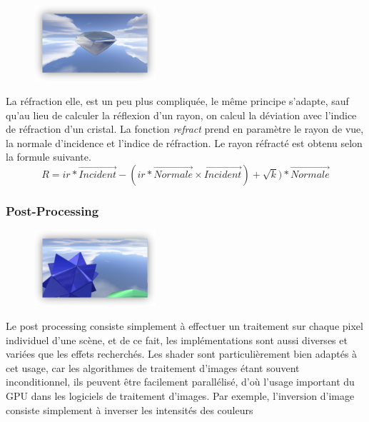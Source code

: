 \documentclass[pdftex, 11pt, a4paper, titlepage]{article}
\newcommand{\vect}[1]{\overrightarrow{#1}}
\begin{document}
\begin{figure}
\vspace{-35pt}
\begin{centering}
\includegraphics[width=0.4\textwidth]{ssRefract}
\end{centering}
\vspace{-35pt}
\end{figure}

La réfraction elle, est un peu plus compliquée, le même principe s'adapte, 
sauf qu'au lieu de calculer la réflexion d'un rayon, on calcul la 
déviation avec l'indice de réfraction d'un cristal. La fonction \emph{refract}
 prend en paramètre le rayon de vue, la normale d'incidence et
 l'indice de réfraction. Le rayon réfracté est obtenu selon la
 formule suivante.
\begin{equation*}
R = ir * \vect{Incident} - (ir * \vect{Normale} \times \vect{Incident}) + \sqrt{k}) * \vect{Normale}
\end{equation*}
\pagebreak
\subsubsection{Post-Processing}

\begin{figure}
\vspace{-35pt}
\begin{centering}
\includegraphics[width=0.4\textwidth]{ssBlur}
\end{centering}
\vspace{-35pt}
\end{figure}
Le post processing consiste simplement à effectuer un traitement sur
chaque pixel individuel d'une scène, et de ce fait, les implémentations sont
aussi diverses et variées que les effets recherchés. Les shader sont particulièrement
bien adaptés à cet usage, car les algorithmes de traitement d'images étant souvent
inconditionnel, ils peuvent être facilement parallélisé, d'où l'usage important du GPU
dans les logiciels de traitement d'images.
Par exemple, l'inversion d'image consiste simplement à inverser les intensités
des couleurs
\end{document}

